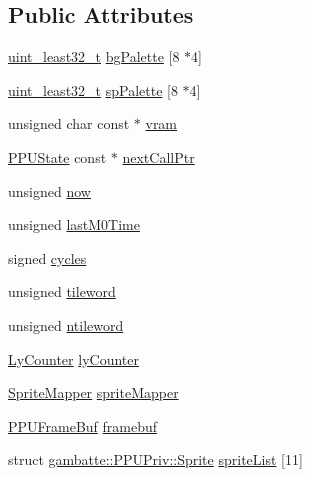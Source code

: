\subsection*{Public Attributes}
\begin{DoxyCompactItemize}
\item 
\hyperlink{namespacegambatte_a0639f09fccfbbd5a8e0796318768e370}{uint\+\_\+least32\+\_\+t} \hyperlink{structgambatte_1_1PPUPriv_a9f10e0f050497a5ba47b0fe84bff3450}{bg\+Palette} \mbox{[}8 $\ast$4\mbox{]}
\item 
\hyperlink{namespacegambatte_a0639f09fccfbbd5a8e0796318768e370}{uint\+\_\+least32\+\_\+t} \hyperlink{structgambatte_1_1PPUPriv_a82351915dfa8d9a922bdc335636ee8aa}{sp\+Palette} \mbox{[}8 $\ast$4\mbox{]}
\item 
unsigned char const  $\ast$ \hyperlink{structgambatte_1_1PPUPriv_a4ab22f440df8bcc60984c9058492dcde}{vram}
\item 
\hyperlink{structgambatte_1_1PPUState}{P\+P\+U\+State} const  $\ast$ \hyperlink{structgambatte_1_1PPUPriv_a5e9f54270b9819c6e982585a350b78c2}{next\+Call\+Ptr}
\item 
unsigned \hyperlink{structgambatte_1_1PPUPriv_ab89c0f52942e085ba8168860fd68b006}{now}
\item 
unsigned \hyperlink{structgambatte_1_1PPUPriv_a534222e4b24c8a6479020aaa0fec2e4a}{last\+M0\+Time}
\item 
signed \hyperlink{structgambatte_1_1PPUPriv_a78786db421df1ca669ec10895ad46c47}{cycles}
\item 
unsigned \hyperlink{structgambatte_1_1PPUPriv_a4ab0024dfacb7e9ad1fc89240033a604}{tileword}
\item 
unsigned \hyperlink{structgambatte_1_1PPUPriv_a59f367a6854c749f3c36773e87c47659}{ntileword}
\item 
\hyperlink{classgambatte_1_1LyCounter}{Ly\+Counter} \hyperlink{structgambatte_1_1PPUPriv_aa12c19fee206a403bb5eafea3a696ceb}{ly\+Counter}
\item 
\hyperlink{classgambatte_1_1SpriteMapper}{Sprite\+Mapper} \hyperlink{structgambatte_1_1PPUPriv_af3d873a13e90fb3bf19bca6ee1a35ba5}{sprite\+Mapper}
\item 
\hyperlink{classgambatte_1_1PPUFrameBuf}{P\+P\+U\+Frame\+Buf} \hyperlink{structgambatte_1_1PPUPriv_ab99e1681d0ee5ae3815e6f560de410b2}{framebuf}
\item 
struct \hyperlink{structgambatte_1_1PPUPriv_1_1Sprite}{gambatte\+::\+P\+P\+U\+Priv\+::\+Sprite} \hyperlink{structgambatte_1_1PPUPriv_ac715792e2dbe5fc83c0be7cb444e1726}{sprite\+List} \mbox{[}11\mbox{]}

\end{DoxyCompactItemize}
